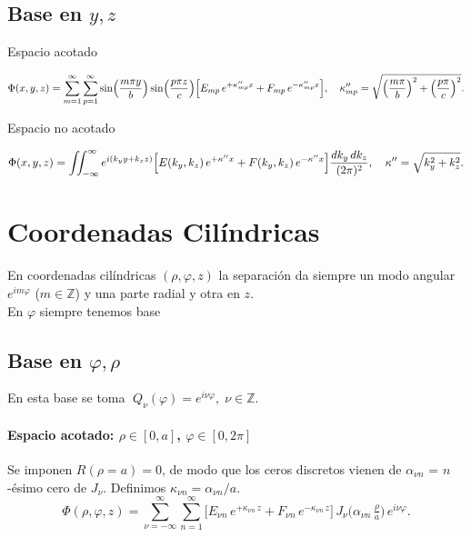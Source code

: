 \documentclass[12pt,a4paper]{article}
\begin{document}
\subsection{Base en $y,z$}


Espacio acotado

\begin{equation}
\Phi(x,y,z)
=\sum_{m=1}^{\infty}\sum_{p=1}^{\infty}
\sin\Bigl(\frac{m\pi y}{b}\Bigr)
\sin\Bigl(\frac{p\pi z}{c}\Bigr)
\Bigl[
E_{mp}\,e^{+\kappa''_{mp}x}
+ F_{mp}\,e^{-\kappa''_{mp}x}
\Bigr],
\quad
\kappa''_{mp}
=\sqrt{\Bigl(\frac{m\pi}{b}\Bigr)^{2}+\Bigl(\frac{p\pi}{c}\Bigr)^{2}}.
\end{equation}


Espacio no acotado

\begin{equation}
\Phi(x,y,z)
=\iint_{-\infty}^{\infty}
 e^{i(k_y y + k_z z)}
\Bigl[
E(k_y,k_z)\,e^{+\kappa'' x}
+ F(k_y,k_z)\,e^{-\kappa'' x}
\Bigr]
\frac{dk_y\,dk_z}{(2\pi)^2},
\quad
\kappa''=\sqrt{k_y^2+k_z^2}.
\end{equation}

\section{Coordenadas Cilíndricas}

En coordenadas cilíndricas \((\rho,\varphi,z)\) la separación da siempre un modo angular \(e^{i m\varphi}\) (\(m\in\mathbb Z\)) y una parte radial y otra en \(z\). 
\\En $\varphi$ siempre tenemos base

\subsection{Base en \(\varphi,\rho\)}

En esta base se toma
\(\;Q_\nu(\varphi)=e^{i\nu\varphi},\;\nu\in\mathbb Z\).

\paragraph{Espacio acotado: \(\rho\in[0,a]\), \(\varphi\in[0,2\pi]\)}  
Se imponen \(R(\rho=a)=0\), de modo que los ceros discretos vienen de  
\(\alpha_{\nu n}\) = \(n\)-ésimo cero de \(J_\nu\). Definimos  
\(\kappa_{\nu n}=\alpha_{\nu n}/a\).  
\[
\boxed{
\Phi(\rho,\varphi,z)
=\sum_{\nu=-\infty}^{\infty}\sum_{n=1}^{\infty}
\bigl[
E_{\nu n}\,e^{+\kappa_{\nu n}\,z}
+F_{\nu n}\,e^{-\kappa_{\nu n}\,z}
\bigr]\,
J_{\nu}\!\bigl(\alpha_{\nu n}\,\tfrac{\rho}{a}\bigr)\,
e^{i\nu\varphi}.
}
\]
\end{document}

